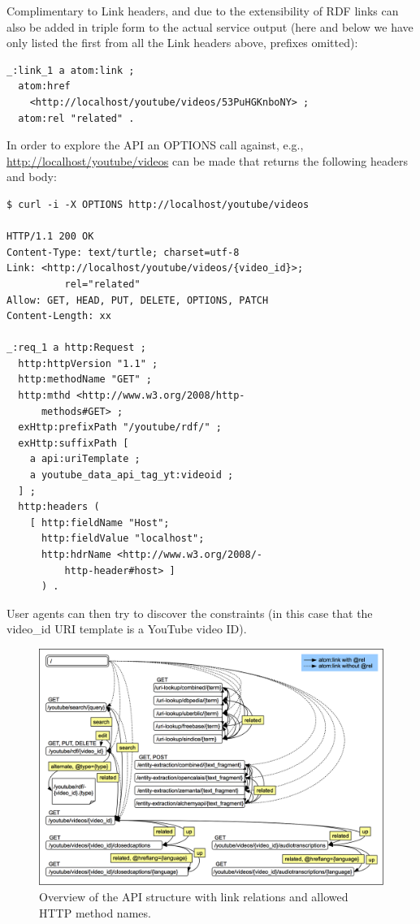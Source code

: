 \documentclass{acm_proc_article-sp}
\begin{document}
Complimentary to Link headers, and due to the extensibility of RDF links can also be added in triple form to the actual service output (here and below we have only listed the first from all the Link headers above, prefixes omitted):
\begin{verbatim}
_:link_1 a atom:link ;
  atom:href
    <http://localhost/youtube/videos/53PuHGKnboNY> ;
  atom:rel "related" .
\end{verbatim}
In order to explore the API an OPTIONS call against, e.g., \url{http://localhost/youtube/videos} can be made that returns the following headers and body:
\begin{verbatim}
$ curl -i -X OPTIONS http://localhost/youtube/videos

HTTP/1.1 200 OK
Content-Type: text/turtle; charset=utf-8
Link: <http://localhost/youtube/videos/{video_id}>;
          rel="related"
Allow: GET, HEAD, PUT, DELETE, OPTIONS, PATCH
Content-Length: xx

_:req_1 a http:Request ;
  http:httpVersion "1.1" ;
  http:methodName "GET" ;
  http:mthd <http://www.w3.org/2008/http-
      methods#GET> ;
  exHttp:prefixPath "/youtube/rdf/" ;
  exHttp:suffixPath [
    a api:uriTemplate ;
    a youtube_data_api_tag_yt:videoid ;
  ] ;
  http:headers (
    [ http:fieldName "Host";
      http:fieldValue "localhost";
      http:hdrName <http://www.w3.org/2008/-
          http-header#host> ]
      ) .
\end{verbatim}
User agents can then try to discover the constraints (in this case that the {video\_id} URI template is a YouTube video ID).
\begin{figure}
 \centering
 \includegraphics[width=\linewidth]{statemachine.png}
 \caption{Overview of the API structure with link relations and allowed HTTP method names.}
 \label{fig:overview}
\end{figure}
\end{document}

